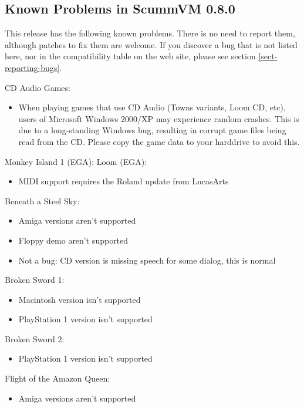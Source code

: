 

\subsection{Known Problems in ScummVM 0.8.0}

This release has the following known problems. There is no need to report them,
although patches to fix them are welcome. If you discover a bug that is not
listed here, nor in the compatibility table on the web site, please see
section \ref{sect-reporting-bugs}.

CD Audio Games:
  \begin{itemize}
  \item When playing games that use CD Audio (Towns variants, Loom CD, etc),
                 users of Microsoft Windows 2000/XP may experience random crashes.
                 This is due to a long-standing Windows bug, resulting in corrupt
                 game files being read from the CD. Please copy the game data to
                 your harddrive to avoid this.
  \end{itemize}
Monkey Island 1 (EGA):
Loom (EGA):
  \begin{itemize}
  \item MIDI support requires the Roland update from LucasArts
  \end{itemize}
Beneath a Steel Sky:
  \begin{itemize}
  \item Amiga versions aren't supported
  \item Floppy demo aren't supported
  \item Not a bug: CD version is missing speech for some dialog, this is
                 normal
  \end{itemize}
Broken Sword 1:
  \begin{itemize}
  \item Macintosh version isn't supported
  \item PlayStation 1 version isn't supported
  \end{itemize}
Broken Sword 2:
  \begin{itemize}
  \item PlayStation 1 version isn't supported
  \end{itemize}
Flight of the Amazon Queen:
  \begin{itemize}
  \item Amiga versions aren't supported
  \end{itemize}
